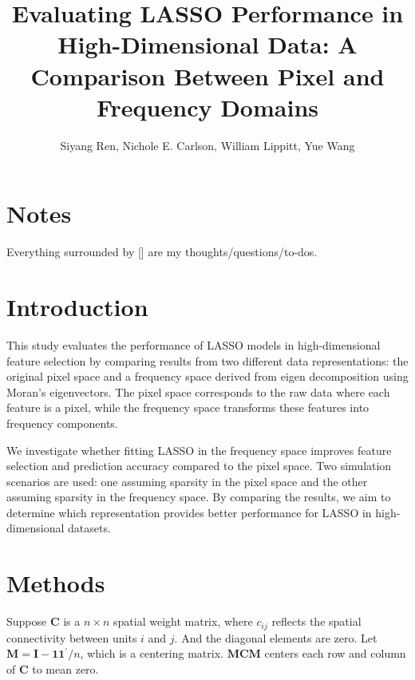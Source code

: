 \documentclass[12pt]{article}
\begin{document}
\title{Evaluating LASSO Performance in High-Dimensional Data: A Comparison Between Pixel and Frequency Domains}
\author{Siyang Ren, Nichole E. Carlson, William Lippitt, Yue Wang}
\date{}
\maketitle


\section*{Notes}

Everything surrounded by [] are my thoughts/questions/to-dos.


\section*{Introduction}

This study evaluates the performance of LASSO models in high-dimensional feature selection by comparing results from two different data representations: the original pixel space and a frequency space derived from eigen decomposition using Moran’s eigenvectors. The pixel space corresponds to the raw data where each feature is a pixel, while the frequency space transforms these features into frequency components.

We investigate whether fitting LASSO in the frequency space improves feature selection and prediction accuracy compared to the pixel space. Two simulation scenarios are used: one assuming sparsity in the pixel space and the other assuming sparsity in the frequency space. By comparing the results, we aim to determine which representation provides better performance for LASSO in high-dimensional datasets.


\section*{Methods}

Suppose \( \mathbf{C} \) is a \( n \times n \) spatial weight matrix, where \( c_{ij} \) reflects the spatial connectivity between units \( i \) and \( j \). And the diagonal elements are zero. Let \( \mathbf{M}=\mathbf{I}-\mathbf{1} \mathbf{1}^{\prime} / n \), which is a centering matrix. \( \mathbf{MCM} \) centers each row and column of \( \mathbf{C} \) to mean zero. 
\end{document}
